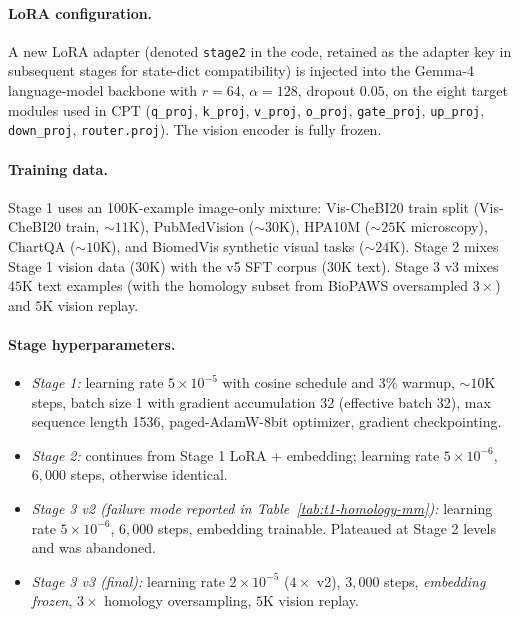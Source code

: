 \documentclass[11pt]{article}
\begin{document}
\paragraph{LoRA configuration.} A new LoRA adapter (denoted \texttt{stage2} in the code, retained as the adapter key in subsequent stages for state-dict compatibility) is injected into the Gemma-4 language-model backbone with $r{=}64$, $\alpha{=}128$, dropout $0.05$, on the eight target modules used in CPT (\texttt{q\_proj}, \texttt{k\_proj}, \texttt{v\_proj}, \texttt{o\_proj}, \texttt{gate\_proj}, \texttt{up\_proj}, \texttt{down\_proj}, \texttt{router.proj}). The vision encoder is fully frozen.

\paragraph{Training data.} Stage 1 uses an 100K-example image-only mixture: Vis-CheBI20 \citep{fan2025ocsu} train split (Vis-CheBI20 train, $\sim 11$K), PubMedVision \citep{pubmedvision2024} ($\sim 30$K), HPA10M \citep{hpa10m2024} ($\sim 25$K microscopy), ChartQA \citep{masry2022chartqa} ($\sim 10$K), and BiomedVis synthetic visual tasks ($\sim 24$K). Stage 2 mixes Stage 1 vision data ($30$K) with the v5 SFT corpus ($30$K text). Stage 3 v3 mixes $45$K text examples (with the homology subset from BioPAWS oversampled $3\times$) and $5$K vision replay.

\paragraph{Stage hyperparameters.}
\begin{itemize}
\setlength{\itemsep}{2pt}
\item \emph{Stage 1:} learning rate $5\!\times\!10^{-5}$ with cosine schedule and $3\%$ warmup, $\sim 10$K steps, batch size 1 with gradient accumulation 32 (effective batch 32), max sequence length 1536, paged-AdamW-8bit optimizer, gradient checkpointing.
\item \emph{Stage 2:} continues from Stage 1 LoRA + embedding; learning rate $5\!\times\!10^{-6}$, $6{,}000$ steps, otherwise identical.
\item \emph{Stage 3 v2 (failure mode reported in Table~\ref{tab:t1-homology-mm}):} learning rate $5\!\times\!10^{-6}$, $6{,}000$ steps, embedding trainable. Plateaued at Stage 2 levels and was abandoned.
\item \emph{Stage 3 v3 (final):} learning rate $2\!\times\!10^{-5}$ ($4\times$ v2), $3{,}000$ steps, \emph{embedding frozen}, $3\times$ homology oversampling, $5$K vision replay.
\end{itemize}
\end{document}
